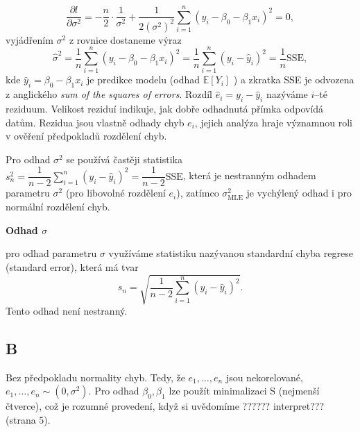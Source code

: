 \begin{equation}
\frac{ \partial l}{ \partial \sigma^{2}} = -\frac{n}{2} \cdot \dfrac{1}{\sigma^{2}} + \dfrac{1}{2 (\sigma^{2})^{2}} \sum_{i=1}^{n} ( y_{i} -  \beta_{0}  - \beta_{1} x_{i})^{2} = 0,
\end{equation}
vyjádřením $ \sigma^{2} $ z rovnice dostaneme výraz
\begin{equation}
\widehat{\sigma}^{2} = \frac{1}{n} \sum_{i=1}^{n} ( y_{i} -  \beta_{0}  - \beta_{1} x_{i})^{2} = \frac{1}{n} \sum_{i=1}^{n} ( y_{i} -  \widehat{y}_{i})^{2} = \dfrac{1}{n} \text{SSE},
\end{equation}
kde $ \widehat{y}_{i} = \beta_{0}  - \beta_{1} x_{i} $ je predikce modelu (odhad $ \mathbb{E} [ Y_{i} ] $ ) a  zkratka SSE je odvozena z anglického \textit{sum of the squares of errors}. Rozdíl $ \widehat{e}_{i} = y_{i} -  \widehat{y}_{i} $ nazýváme $ i $--té reziduum. Velikost reziduí indikuje, jak dobře odhadnutá přímka odpovídá datům. Rezidua jsou vlastně odhady chyb $ e_{i} $,  jejich analýza hraje významnou roli v ověření předpokladů rozdělení chyb.

\begin{remark}
Pro odhad $ \sigma^{2} $ se používá častěji statistika $ s^{2}_{n} = \dfrac{1}{n - 2} \sum_{i=1}^{n}(y_{i} -  \widehat{y}_{i})^{2} = \dfrac{1}{n-2} \text{SSE} $, která je nestranným odhadem parametru $ \sigma^{2} $ (pro libovolné rozdělení $ e_{i} $), zatímco $ \sigma^{2}_{\text{MLE}} $ je vychýlený odhad i pro normální rozdělení chyb.
\end{remark}
\textbf{Odhad $ \sigma $}

pro odhad parametru $ \sigma $ využíváme statistiku nazývanou standardní chyba regrese (standard error), která má tvar
\begin{equation}
 s_{n} = \sqrt{\dfrac{1}{n-2} \sum_{i=1}^{n}(y_{i} -  \widehat{y}_{i})^{2}}.
\end{equation}
Tento odhad není nestranný.

\subsection{B}
Bez předpokladu normality chyb. Tedy, že $ e_{1}, \dots , e_{n} $ jsou nekorelované, $ e_{1}, \dots , e_{n} \sim (0,\sigma^{2}) $.
Pro odhad $ \beta_{0}, \beta_{1} $ lze použít minimalizaci S (nejmenší čtverce), což je rozumné provedení, když si uvědomíme ?????? interpret??? (strana 5).

